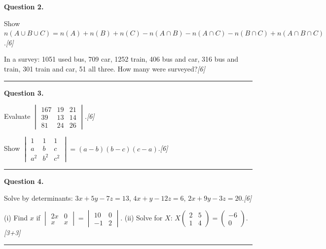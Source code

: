 \documentclass[11pt,a4paper]{article}
\newcommand{\pts}[1]{\hfill   \textit{[#1]}}
\begin{document}
\medskip


\noindent   \textbf{Question 2.}

\begin{parts}
  \item Show $n(A\cup B\cup C)=n(A)+n(B)+n(C)-n(A\cap B)-n(A\cap C)-n(B\cap C)+n(A\cap B\cap C)$.\pts{6}
  \item In a survey: 1051 used bus, 709 car, 1252 train, 406 bus and car, 316 bus and train, 301 train and car, 51 all three. How many were surveyed?\pts{6}
\end{parts}
\medskip\rule{\linewidth}{0.2pt}

\medskip


\noindent   \textbf{Question 3.}

\begin{parts}
  \item Evaluate $
\begin{vmatrix}167&19&21\\39&13&14\\81&24&26\end{vmatrix}$.\pts{6}
  \item Show $
\begin{vmatrix}1&1&1\\a&b&c\\a^2&b^2&c^2\end{vmatrix}=(a-b)(b-c)(c-a)$.\pts{6}
\end{parts}
\medskip\rule{\linewidth}{0.2pt}

\medskip


\noindent   \textbf{Question 4.}

\begin{parts}
  \item Solve by determinants: $3x+5y-7z=13$, $4x+y-12z=6$, $2x+9y-3z=20$.\pts{6}
  \item (i) Find $x$ if $
\begin{vmatrix}2x&0\\x&x\end{vmatrix}=
\begin{vmatrix}10&0\\-1&2\end{vmatrix}$. (ii) Solve for $X$: $X
\begin{pmatrix}2&5\\1&4\end{pmatrix}=
\begin{pmatrix}-6\\0\end{pmatrix}$.\pts{3+3}
\end{parts}
\medskip\rule{\linewidth}{0.2pt}
\end{document}
